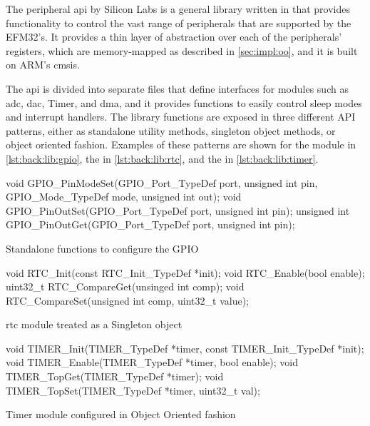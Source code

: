 The {\emlib} peripheral \gls{api} by Silicon Labs is a general library written in {\C} that provides functionality to control the vast range of peripherals that are supported by the EFM32's.
It provides a thin layer of abstraction over each of the peripherals' registers, which are memory-mapped as described in \autoref{sec:impl:oo}, and it is built on ARM's \gls{cmsis}.

The \gls{api} is divided into separate files that define interfaces for modules such as \gls{adc}, \gls{dac}, Timer, and \gls{dma}, and it provides functions to easily control sleep modes and interrupt handlers.
The library functions are exposed in three different API patterns, either as standalone utility methods, singleton object methods, or {\C} object oriented fashion.
Examples of these patterns are shown for the  module in \autoref{lst:back:lib:gpio}, the  in \autoref{lst:back:lib:rtc}, and the  in \autoref{lst:back:lib:timer}.

\begin{listing}[H]
  \begin{ccode}
void GPIO_PinModeSet(GPIO_Port_TypeDef port, unsigned int pin,
                     GPIO_Mode_TypeDef mode, unsigned int out);
void GPIO_PinOutSet(GPIO_Port_TypeDef port, unsigned int pin);
unsigned int GPIO_PinOutGet(GPIO_Port_TypeDef port,
                            unsigned int pin);
  \end{ccode}
  \caption{Standalone functions to configure the GPIO}
  \label{lst:back:lib:gpio}
\end{listing}

\begin{listing}[H]
  \begin{ccode}
void RTC_Init(const RTC_Init_TypeDef *init);
void RTC_Enable(bool enable);
uint32_t RTC_CompareGet(unsinged int comp);
void RTC_CompareSet(unsigned int comp, uint32_t value);
  \end{ccode}
  \caption{\gls{rtc} module treated as a Singleton object}
  \label{lst:back:lib:rtc}
\end{listing}

\begin{listing}[H]
  \begin{ccode}
void TIMER_Init(TIMER_TypeDef *timer,
                const TIMER_Init_TypeDef *init);
void TIMER_Enable(TIMER_TypeDef *timer, bool enable);
void TIMER_TopGet(TIMER_TypeDef *timer);
void TIMER_TopSet(TIMER_TypeDef *timer, uint32_t val);
  \end{ccode}
  \caption{Timer module configured in {\C} Object Oriented fashion}
  \label{lst:back:lib:timer}
\end{listing}

